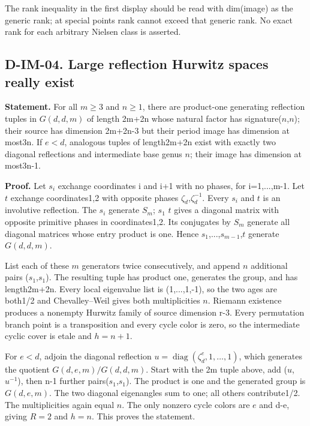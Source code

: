 The rank inequality in the first display should be read with dim(image) as the generic rank; at special points rank cannot exceed that generic rank. No exact rank for each arbitrary Nielsen class is asserted.

\subsection{D-IM-04. Large reflection Hurwitz spaces really exist}
\label{D-IM-04}

\textbf{Statement.} For all \(m\geq 3\) and \(n\geq 1\), there are product-one generating reflection tuples in \(G(d,d,m)\) of length 2m+2n whose natural factor has signature(\(n\),\(n\)); their source has dimension 2m+2n-3 but their period image has dimension at most3n. If \(e< d\), analogous tuples of length2m+2n exist with exactly two diagonal reflections and intermediate base genus \(n\); their image has dimension at most3n-1.

\textbf{Proof.} Let \(s_i\) exchange coordinates i and i+1 with no phases, for i=1,...,m-1. Let \(t\) exchange coordinates1,2 with opposite phases \(\zeta_d\),\(\zeta_d^{-1}\). Every \(s_i\) and \(t\) is an involutive reflection. The \(s_i\) generate \(S_m\); \(s_1\) \(t\) gives a diagonal matrix with opposite primitive phases in coordinates1,2. Its conjugates by \(S_m\) generate all diagonal matrices whose entry product is one. Hence \(s_1\),...,\(s_{m-1}\),\(t\) generate \(G(d,d,m)\).

List each of these \(m\) generators twice consecutively, and append \(n\) additional pairs (\(s_1\),\(s_1\)). The resulting tuple has product one, generates the group, and has length2m+2n. Every local eigenvalue list is (1,...,1,-1), so the two ages are both1/2 and Chevalley--Weil gives both multiplicities \(n\). Riemann existence produces a nonempty Hurwitz family of source dimension r-3. Every permutation branch point is a transposition and every cycle color is zero, so the intermediate cyclic cover is etale and \(h= n+1\).

For \(e< d\), adjoin the diagonal reflection \(u=\operatorname{diag}(\zeta_d^e,1,\ldots,1)\), which generates the quotient \(G(d,e,m)/G(d,d,m)\). Start with the 2m tuple above, add (\(u\),\(u^{-1}\)), then n-1 further pairs(\(s_1\),\(s_1\)). The product is one and the generated group is \(G(d,e,m)\). The two diagonal eigenangles sum to one; all others contribute1/2. The multiplicities again equal \(n\). The only nonzero cycle colors are \(e\) and d-e, giving \(R= 2\) and \(h= n\). This proves the statement.

